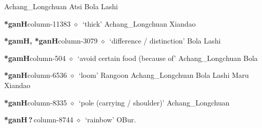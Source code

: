 \hspace{1ex}
         Achang\_Longchuan 
\hspace{1ex}
         Atsi 
\hspace{1ex}
         Bola 
\hspace{1ex}
         Lashi 
  \item {\footnotesize \textbf{*ganH}}{\tiny column-11383}
         $\diamond$~`thick'
         Achang\_Longchuan 
\hspace{1ex}
         Xiandao 
  \item {\footnotesize \textbf{*gamH, *ganH}}{\tiny column-3079}
         $\diamond$~`difference / distinction'
         Bola 
\hspace{1ex}
         Lashi 
  \item {\footnotesize \textbf{*gamH}}{\tiny column-504}
         $\diamond$~`avoid certain food (because of'
         Achang\_Longchuan 
\hspace{1ex}
         Bola 
  \item {\footnotesize \textbf{*ganH}}{\tiny column-6536}
         $\diamond$~`loom'
         Rangoon 
\hspace{1ex}
         Achang\_Longchuan 
\hspace{1ex}
         Bola 
\hspace{1ex}
         Lashi 
\hspace{1ex}
         Maru 
\hspace{1ex}
         Xiandao 
  \item {\footnotesize \textbf{*ganH}}{\tiny column-8335}
         $\diamond$~`pole (carrying / shoulder)'
         Achang\_Longchuan 
  \item {\footnotesize \textbf{*ganH\,?\,}}{\tiny column-8744}
         $\diamond$~`rainbow'
         OBur. 
